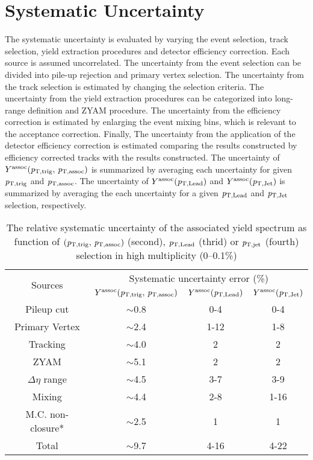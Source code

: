 \section{Systematic Uncertainty}
\label{sec:uncertainties}
The systematic uncertainty is evaluated by varying the event selection, track selection, yield extraction procedures and detector efficiency correction. Each source is assumed uncorrelated. The uncertainty from the event selection can be divided into pile-up rejection and primary vertex selection. The uncertainty from the track selection is estimated by changing the selection criteria. The uncertainty from the yield extraction procedures can be categorized into long-range definition and ZYAM procedure. The uncertainty from the efficiency correction is estimated by enlarging the event mixing bins, which is relevant to the acceptance correction. Finally, The uncertainty from the application of the detector efficiency correction is estimated comparing the results constructed by efficiency corrected tracks with the results constructed. The uncertainty of $Y^{\rm{assoc}}(\it{p}_{\rm{T, trig}},\,\it{p}_{\rm{T, assoc}})$ is summarized by averaging each uncertainty for given $\it{p}_{\rm{T, trig}}$ and $\it{p}_{\rm{T, assoc}}$. The uncertainty of $Y^{\rm{assoc}}(\it{p}_{\rm{T, Lead}})$ and $Y^{\rm{assoc}}(\it{p}_{\rm{T, Jet}})$ is summarized by averaging the each uncertainty for a given $\it{p}_{\rm{T, Lead}}$ and $\it{p}_{\rm{T, Jet}}$ selection, respectively.
\begin{table}[!h]
\caption{ The relative systematic uncertainty of the associated yield spectrum as function of 
$(\it{p}_{\rm{T, trig}},\,\it{p}_{\rm{T, assoc}})$ (second), $\it{p}_{\rm{T,Lead}}$ (thrid) or $\it{p}_{\rm{T,jet}}$ (fourth) selection in high multiplicity (0--0.1\%) }
\centering
\begin{tabular}{|c|c|c|c|}
\hline 
\multirow{2}{*}{Sources}  & \multicolumn{3}{c|}{Systematic uncertainty error (\%)} \\\cline{2-4}
         & $Y^{\rm{assoc}}(\it{p}_{\rm{T, trig}},\,\it{p}_{\rm{T, assoc}})$ & $Y^{\rm{assoc}}(\it{p}_{\rm{T, Lead}})$ & $Y^{\rm{assoc}}(\it{p}_{\rm{T, Jet}})$ \\ \hline \hline
Pileup cut			& $\sim$0.8	&0-4		&0-4		\\ \hline
Primary Vertex		& $\sim$2.4	&1-12	&1-8		\\ \hline

Tracking			& $\sim$4.0 	&2		&2		\\ \hline

ZYAM			& $\sim$5.1	&2		&2		\\ \hline
$\Delta\eta$ range	& $\sim$4.5	&3-7		&3-9		\\ \hline

Mixing			& $\sim$4.4	&2-8		&1-16	\\ \hline

M.C. non-closure*	& $\sim$2.5 	&1		&1		\\ \hline
Total 			& $\sim$9.7	&4-16	&4-22	\\ 
\hline 
\end{tabular}

\end{table}

